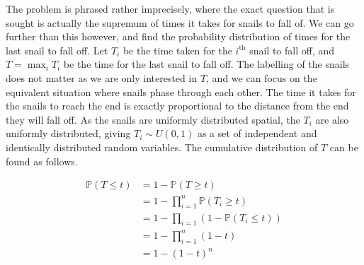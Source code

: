 The problem is phrased rather imprecisely, where the exact question that is sought is actually the supremum of times it takes for snails to fall of. We can go further than this however, and find the probability distribution of times for the last snail to fall off. Let $T_i$ be the time taken for the $i^\text{th}$ snail to fall off, and $T = \max_i{T_i}$ be the time for the last snail to fall off. The labelling of the snails does not matter as we are only interested in $T$, and we can focus on the equivalent situation where snails phase through each other. The time it takes for the snails to reach the end is exactly proportional to the distance from the end they will fall off. As the snails are uniformly distributed spatial, the $T_i$ are also uniformly distributed, giving $T_i \sim U(0, 1)$ as a set of independent and identically distributed random variables. The cumulative distribution of $T$ can be found as follows.

\begin{align*}
    \mathbb{P}(T \le t) &= 1 - \mathbb{P}(T \ge t)  \\
    &= 1 - \prod_{i=1}^n \mathbb{P}(T_i \ge t)  \\
    &= 1 - \prod_{i=1} \left(1 - \mathbb{P}(T_i \le t)\right)  \\
    &= 1 - \prod_{i=1}^n (1 - t)  \\
    &= 1 - (1 - t)^n
\end{align*}